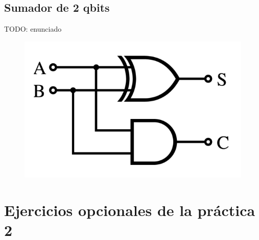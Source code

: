 \documentclass[11pt]{article}
\begin{document}
\subsection{Sumador de 2 qbits}

TODO: enunciado

\begin{figure}[H]
	\centering
	\includegraphics[scale=0.8]{figures/sumator_statement.png}
\end{figure}


\section{Ejercicios opcionales de la práctica 2}
\end{document}
